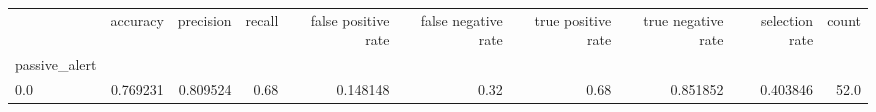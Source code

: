 \begin{tabular}{lrrrrrrrrr}
\toprule
{} &  accuracy &  precision &  recall &  false positive rate &  false negative rate &  true positive rate &  true negative rate &  selection rate &  count \\
passive\_alert &           &            &         &                      &                      &                     &                     &                 &        \\
\midrule
0.0           &  0.769231 &   0.809524 &    0.68 &             0.148148 &                 0.32 &                0.68 &            0.851852 &        0.403846 &   52.0 \\
\bottomrule
\end{tabular}
